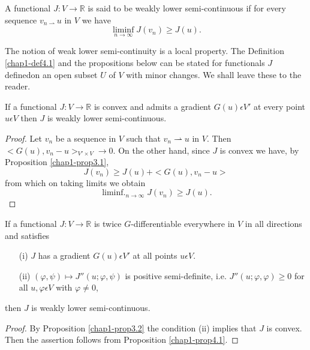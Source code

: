 \begin{definition}\label{chap1-def4.1}
A functional $J : V \to \mathbb{R}$ is said to be weakly lower semi-continuous if for every sequence $v_{n \rightharpoonup} u$ in $V$ we have
$$
\mathop{\lim \inf}_{n \to \infty} J(v_{n}) \geq J(u).
$$
\end{definition}

\begin{remark}\label{chap1-rem4.1}
  The notion of weak lower semi-continuity is a local property. The Definition \ref{chap1-def4.1} and the propositions below can be stated for functionals $J$ defined\pageoriginale on an open subset $U$ of $V$ with minor changes. We shall leave these to the reader.
\end{remark}

\begin{proposition}\label{chap1-prop4.1}
If a functional $J : V \to \mathbb{R}$ is convex and admits a gradient $G(u) \epsilon V'$ at every point $u \epsilon V$ then $J$ is weakly lower semi-continuous.
\end{proposition}

\begin{proof}
Let $v_{n}$ be a sequence in $V$ such that $v_{n} \rightharpoonup  u$ in $V$. Then $<G(u), v_{n} - u>_{V' \times V} \to 0$. On the other hand, since $J$ is convex we have, by Proposition \ref{chap1-prop3.1},
$$
J(v_{n}) \geq J(u) + <G(u), v_{n} - u>
$$
from which on taking limits we obtain
$$
\mathop{\lim \inf.}_{n \to \infty} J(v_{n}) \geq J(u).
$$
\end{proof}

\begin{proposition}\label{chap1-prop4.2}
If a functional $J : V \to \mathbb{R}$ is twice $G$-differentiable everywhere in $V$ in all directions and satisfies
\begin{enumerate}
\item[(i)] $J$ has a gradient $G(u) \epsilon V'$ at all points $u \epsilon V$.
\item[(ii)] $(\varphi, \psi) \mapsto J''(u ; \varphi, \psi)$ is positive semi-definite, i.e. $J''(u; \varphi, \varphi) \geq 0$ for all $u, \varphi \epsilon V$ with $\varphi \neq 0$,
\end{enumerate}
then $J$ is weakly lower semi-continuous.
\end{proposition}

\begin{proof}
By Proposition \ref{chap1-prop3.2} the condition (ii) implies that $J$ is convex. Then the assertion follows from Proposition \ref{chap1-prop4.1}.
\end{proof}

